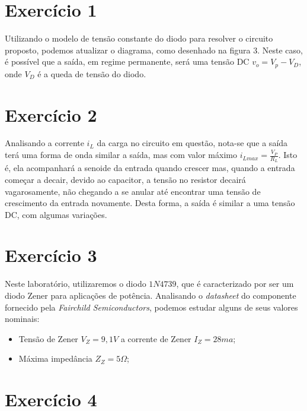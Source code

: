 \documentclass[12pt, a4paper, twoside]{article}
\begin{document}
\section{Exercício 1}


Utilizando o modelo de tensão constante do diodo para resolver o circuito proposto, podemos atualizar o diagrama, como desenhado na figura 3. Neste caso, é possível que a saída, em regime permanente, será uma tensão DC $v_o = V_p - V_D$, onde $V_D$ é a queda de tensão do diodo.

\section{Exercício 2}


Analisando a corrente $i_L$ da carga no circuito em questão, nota-se que a saída terá uma forma de onda similar a saída, mas com valor máximo $i_{Lmax} = \frac{V_P}{R_L}$. Isto é, ela acompanhará a senoide da entrada quando crescer mas, quando a entrada começar a decair, devido ao capacitor, a tensão no resistor decairá vagarosamente, não chegando a se anular até encontrar uma tensão de crescimento da entrada novamente. Desta forma, a saída é similar a uma tensão DC, com algumas variações.

\section{Exercício 3}

Neste laboratório, utilizaremos o diodo $1N4739$, que é caracterizado por ser um diodo Zener para aplicações de potência. Analisando o \textit{datasheet} do componente fornecido pela \textit{Fairchild Semiconductors}, podemos estudar alguns de seus valores nominais:

\begin{itemize}
    \item Tensão de Zener $V_Z = 9,1V$ a corrente de Zener $I_Z = 28ma$;
    \item Máxima impedância $Z_Z = 5 \Omega$;
\end{itemize}

\section{Exercício 4}
\end{document}
